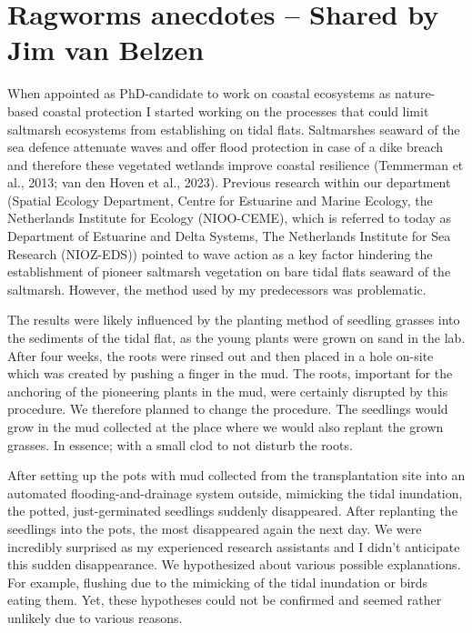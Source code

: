 \documentclass[authordate, empirical]{jote-new-article}
\author[1]{\mbox{Jim van Belzen\orcid{0000-0003-2099-1545}}}
\affil[1]{Wageningen Marine Research (WMR) & Department of Estuarine and Delta Systems (EDS), Royal Netherlands Institute for Sea Research (NIOZ)}
\begin{document}
\begin{frontmatter}
  \maketitle
  \begin{abstract}
    \printabstracttext
  \end{abstract}
\end{frontmatter}


	\section{Ragworms anecdotes -- Shared by Jim van Belzen}



	When appointed as PhD-candidate to work on coastal ecosystems as nature-based coastal protection I started working on the processes that could limit saltmarsh ecosystems from establishing on tidal flats. Saltmarshes seaward of the sea defence attenuate waves and offer flood protection in case of a dike breach and therefore these vegetated wetlands improve coastal resilience (Temmerman et al., 2013; van den Hoven et al., 2023). Previous research within our department (Spatial Ecology Department, Centre for Estuarine and Marine Ecology, the Netherlands Institute for Ecology (NIOO-CEME), which is referred to today as Department of Estuarine and Delta Systems, The Netherlands Institute for Sea Research (NIOZ-EDS)) pointed to wave action as a key factor hindering the establishment of pioneer saltmarsh vegetation on bare tidal flats seaward of the saltmarsh. However, the method used by my predecessors was problematic.



	The results were likely influenced by the planting method of seedling grasses into the sediments of the tidal flat, as the young plants were grown on sand in the lab. After four weeks, the roots were rinsed out and then placed in a hole on-site which was created by pushing a finger in the mud. The roots, important for the anchoring of the pioneering plants in the mud, were certainly disrupted by this procedure. We therefore planned to change the procedure. The seedlings would grow in the mud collected at the place where we would also replant the grown grasses. In essence; with a small clod to not disturb the roots.



	After setting up the pots with mud collected from the transplantation site into an automated flooding-and-drainage system outside, mimicking the tidal inundation, the potted, just-germinated seedlings suddenly disappeared. After replanting the seedlings into the pots, the most disappeared again the next day. We were incredibly surprised as my experienced research assistants and I didn't anticipate this sudden disappearance. We hypothesized about various possible explanations. For example, flushing due to the mimicking of the tidal inundation or birds eating them. Yet, these hypotheses could not be confirmed and seemed rather unlikely due to various reasons.
\end{document}
